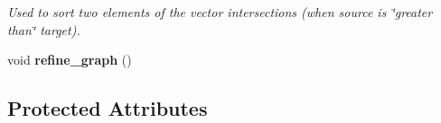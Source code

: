 \begin{DoxyCompactItemize}
\begin{DoxyCompactList}\small\item\em Used to sort two elements of the vector intersections (when source is \char`\"{}greater than\char`\"{} target). \item\end{DoxyCompactList}\item 
\hypertarget{classintersector__Formaggia_a2fcb8c0963fc56f7a3063dc25ae32d89}{
void {\bfseries refine\_\-graph} ()}
\label{classintersector__Formaggia_a2fcb8c0963fc56f7a3063dc25ae32d89}

\end{DoxyCompactItemize}
\subsection*{Protected Attributes}
